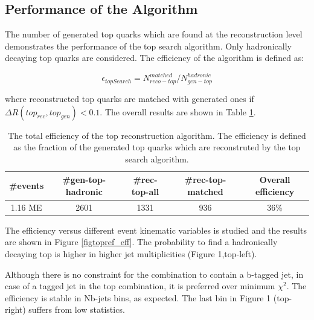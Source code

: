 \subsection{Performance of the Algorithm}
The number of generated top quarks which are found at the reconstruction level demonstrates the performance of the top search algorithm.
Only hadronically decaying top quarks are considered. The efficiency of the algorithm is defined as: 

$$\epsilon_{topSearch} = N_{reco-top}^{matched}  / N_{gen-top}^{hadronic}$$

where reconstructed top quarks are matched with generated ones if $\Delta R(top_{rec},top_{gen}) < 0.1$. The overall results are shown in Table \ref{tbltopreceff}.

\begin{table}[htb]
  \begin{center}
    \begin{tabular}{|c|c|c|c|c|}
      \hline
      \textbf{\#events}  &  \textbf{\#gen-top-hadronic}  &  \textbf{\#rec-top-all}  &  \textbf{\#rec-top-matched}  &  \textbf{Overall efficiency}  \\
      \hline
      1.16 ME          &                        2601  &                   1331  &                   936  &  36\%                  \\
      \hline
    \end{tabular}
    \caption{The total efficiency of the top reconstruction algorithm. The efficiency is defined as the fraction of the generated top quarks which are reconstruted by the top search algorithm.}
    \label{tbltopreceff}
  \end{center}
\end{table}

The efficiency versus different event kinematic variables is studied and the results are shown in Figure \ref{figtopref_eff}.
 The probability to find a hadronically decaying top is higher in higher jet multiplicities (Figure 1,top-left).

Although there is no constraint for the combination to contain a b-tagged jet, in case of a tagged jet in the top combination, it is preferred over minimum $\chi^2$. The efficiency is stable in Nb-jets bins, as expected. The last bin in Figure 1 (top-right) suffers from low statistics.

